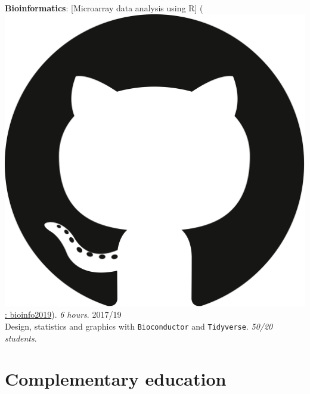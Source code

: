 \documentclass[margin,line]{res}
\begin{document}
\begin{resume}
{\bf Bioinformatics}: [Microarray data analysis using R] (\href{https://github.com/avallecam/bioinfo2019}{\includegraphics[scale=.004]{../figure/gh_logo.png}: bioinfo2019}). \textit{6 hours}.  \hfill {2017/19}\\ Design, statistics and graphics with \texttt{Bioconductor} and \texttt{Tidyverse}. \textit{50/20 students}. \\



\section{\sc Complementary education}


\end{resume}
\end{document}
